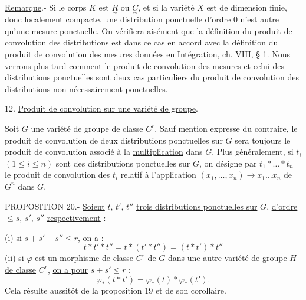 
\uline{Remarque}.- Si le corps $K$ est $\underset{\sim}{R}$ ou $\underset{\sim}{C}$, et si la variété $X$ est de dimension finie, donc localement compacte, une distribution ponctuelle d'ordre $0$ n'est autre qu'une \uline{mesure} ponctuelle. On vérifiera aisément que la définition du produit de convolution des distributions est dans ce cas en accord avec la définition du produit de convolution des mesures données en Intégration, ch. VIII, § 1. Nous verrons plus tard comment le produit de convolution des mesures et celui des distributions ponctuelles sont deux cas particuliers du produit de convolution des distributions non nécessairement ponctuelles.

12. \uline{Produit de convolution sur une variété de groupe}.

Soit $G$ une variété de groupe de classe $C^r$. Sauf mention expresse du contraire, le produit de convolution de deux distributions ponctuelles sur $G$ sera toujours le produit de convolution associé à la \uline{multiplication} dans $G$. Plus généralement, si $t_i$ $(1\leq i\leq n)$ sont des distributions ponctuelles sur $G$, on désigne par $t_1*\ldots*t_n$ le produit de convolution des $t_i$ relatif à l'application $(x_1,\ldots,x_n)\longrightarrow x_1\ldots x_n$ de $G^n$ dans $G$.

PROPOSITION 20.- \uline{Soient} $t$, $t'$, $t''$ \uline{trois distributions ponctuelles sur} $G$, \uline{d'ordre} $\leq s$, $s'$, $s''$ \uline{respectivement} :

(i) \uline{si} $s+s'+s''\leq r$, \uline{on a} :
\[
t*t'*t''=t*(t'*t'')=(t*t')*t''
\]
(ii) \uline{si} $\varphi$ \uline{est un morphisme de classe} $C^r$ \uline{de} $G$ \uline{dans une autre variété de groupe} $H$ \uline{de classe} $C^r$, \uline{on a pour} $s+s'\leq r$ :
\[
\varphi_*(t*t')=\varphi_*(t)*\varphi_*(t').
\]
Cela résulte aussitôt de la proposition 19 et de son corollaire.
